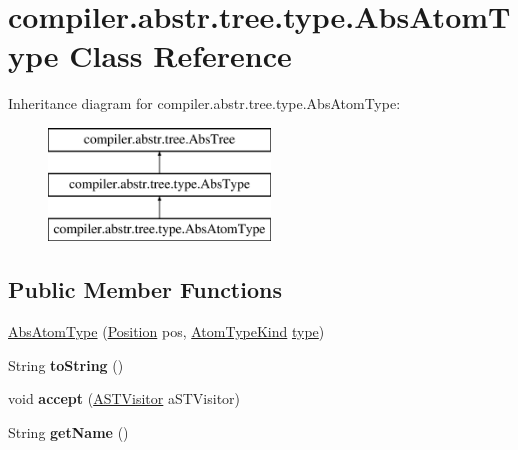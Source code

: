 \hypertarget{classcompiler_1_1abstr_1_1tree_1_1type_1_1_abs_atom_type}{}\section{compiler.\+abstr.\+tree.\+type.\+Abs\+Atom\+Type Class Reference}
\label{classcompiler_1_1abstr_1_1tree_1_1type_1_1_abs_atom_type}
Inheritance diagram for compiler.\+abstr.\+tree.\+type.\+Abs\+Atom\+Type\+:\begin{figure}[H]
\begin{center}
\leavevmode
\includegraphics[height=3.000000cm]{classcompiler_1_1abstr_1_1tree_1_1type_1_1_abs_atom_type}
\end{center}
\end{figure}
\subsection*{Public Member Functions}
\begin{DoxyCompactItemize}
\item 
\hyperlink{classcompiler_1_1abstr_1_1tree_1_1type_1_1_abs_atom_type_a0021c1f666fa5972379a77c8a5379722}{Abs\+Atom\+Type} (\hyperlink{classcompiler_1_1_position}{Position} pos, \hyperlink{enumcompiler_1_1abstr_1_1tree_1_1_atom_type_kind}{Atom\+Type\+Kind} \hyperlink{classcompiler_1_1abstr_1_1tree_1_1type_1_1_abs_atom_type_a6a57eb49ff68a7e6be5d3a9ce10480c0}{type})
\item 
\mbox{\label{classcompiler_1_1abstr_1_1tree_1_1type_1_1_abs_atom_type_acfc84315d1c2fb3eaf31c27f27479072}} 
String {\bfseries to\+String} ()
\item 
\mbox{\label{classcompiler_1_1abstr_1_1tree_1_1type_1_1_abs_atom_type_a6ddc10db60a752948aa3165017a9175a}} 
void {\bfseries accept} (\hyperlink{interfacecompiler_1_1abstr_1_1_a_s_t_visitor}{A\+S\+T\+Visitor} a\+S\+T\+Visitor)
\item 
\mbox{\label{classcompiler_1_1abstr_1_1tree_1_1type_1_1_abs_atom_type_afd87ecdbe0d3f9228a59d85746fe1819}} 
String {\bfseries get\+Name} ()
\end{DoxyCompactItemize}
